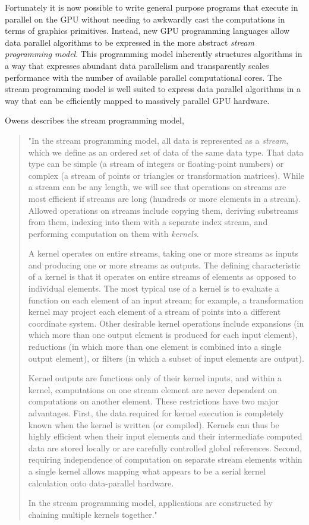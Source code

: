 Fortunately it is now possible to write general purpose programs that execute in parallel on the GPU without needing to awkwardly cast the computations in terms of graphics primitives. Instead, new GPU programming languages allow data parallel algorithms to be expressed in the more abstract \emph{stream programming model}. This programming model inherently structures algorithms in a way that expresses abundant data parallelism and transparently scales performance with the number of available parallel computational cores. The stream programming model is well suited to express data parallel algorithms in a way that can be efficiently mapped to massively parallel GPU hardware.

Owens describes the stream programming model,
\begin{quote}
"In the stream programming model, all data is represented as a \emph{stream}, which we define as an ordered set of data of the same data type. That data type can be simple (a stream of integers or floating-point numbers) or complex (a stream of points or triangles or transformation matrices). While a stream can be any length, we will see that operations on streams are most efficient if streams are long (hundreds or more elements in a stream). Allowed operations on streams include copying them, deriving substreams from them, indexing into them with a separate index stream, and performing computation on them with \emph{kernels}.

A kernel operates on entire streams, taking one or more streams as inputs and producing one or more streams as outputs. The defining characteristic of a kernel is that it operates on entire streams  of elements as opposed to individual elements. The most typical use of a kernel is to evaluate a function on each element of an input stream; for example, a transformation kernel may project each element of a stream of points into a different coordinate system. Other desirable kernel operations include expansions (in which more than one output element is produced for each input element), reductions (in which more than one element is combined into a single output element), or filters (in which a subset of input elements are output).

Kernel outputs are functions only of their kernel inputs, and within a kernel, computations on one stream element are never dependent on computations on another element. These restrictions have two major advantages. First, the data required for kernel execution is completely known when the kernel is written (or compiled). Kernels can thus be highly efficient when their input elements and their intermediate computed data are stored locally  or are carefully controlled global references. Second, requiring independence of computation on separate stream elements within a single kernel allows mapping what appears to be a serial kernel calculation onto data-parallel hardware.

In the stream programming model, applications are constructed by chaining multiple kernels together."~\cite{Owens-2005}
\end{quote}
